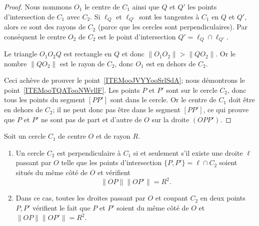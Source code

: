 \begin{proof}
    Nous nommons \( O_1\) le centre de \( C_1\) ainsi que \( Q\) et \( Q'\) les points d'intersection de \( C_1\) avec \( C_2\). Si \( \ell_Q\) et \( \ell_{Q'} \) sont les tangentes à \( C_1\) en \( Q\) et \( Q'\), alors ce sont des rayons de \( C_2\) (parce que les cercles sont perpendiculaires). Par conséquent le centre \( O_2\) de \( C_2\) est le point d'intersection \( Q'=\ell_Q\cap \ell_{Q'}\).

    Le triangle \( O_1O_2Q\) est rectangle en \( Q\) et donc \( \| O_1O_2 \|>\| QO_2 \| \). Or le nombre \( \| QO_2 \|\) est le rayon de \( C_2\), donc \( O_1\) est en dehors de \( C_2\).

    Ceci achève de prouver le point~\ref{ITEMooJVYYooSrlSdA}; nous démontrons le point~\ref{ITEMooTQATooNWvllF}. Les points \( P\) et \( P'\) sont sur le cercle \( C_2\), donc tous les points du segment \( [PP']  \) sont dans le cercle. Or le centre de \( C_1\) doit être en dehors de \( C_2\); il ne peut donc pas être dans le segment \( [PP']\), ce qui prouve que \( P\) et \( P'\) ne sont pas de part et d'autre de \( O\) sur la droite \( (OPP')\).
\end{proof}

\begin{proposition}      \label{PROPooYSVYooOFKxib}
    Soit un cercle \( C_1\) de centre \( O\) et de rayon \( R\).
    \begin{enumerate}
        \item       \label{ITEMooWYIJooAAmXUl}
            Un cercle \( C_2\) est perpendiculaire à \( C_1\) si et seulement s'il existe une droite \( \ell\) passant par \( O\) telle que les points d'intersection \( \{ P,P' \}= \ell\cap C_2\) soient situés du même côté de \( O\) et vérifient
            \begin{equation}
        \| OP \|\| OP' \|=R^2.
    \end{equation}
        \item       \label{ITEMooYKZOooYZKyhF}
            Dans ce cas, toutes les droites passant par \( O\) et coupant \( C_2\) en deux points \( P,P'\) vérifient le fait que \( P\) et \( P'\) soient du même côté de \( O\) et \( \| OP \|\| OP' \|=R^2\).
    \end{enumerate}
\end{proposition}


